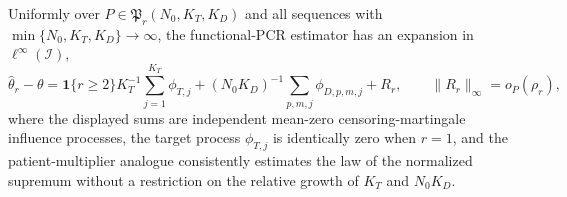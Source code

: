 Uniformly over \(P\in\mathfrak P_r(N_0,K_T,K_D)\) and all sequences with \(\min\{N_0,K_T,K_D\}\to\infty\), the functional-PCR estimator has an expansion in \(\ell^\infty(\mathcal I)\), \[\widehat\theta_r-\theta=\mathbf 1\{r\ge2\}K_T^{-1}\sum_{j=1}^{K_T}\phi_{T,j}+(N_0K_D)^{-1}\sum_{p,m,j}\phi_{D,p,m,j}+R_r,\qquad \|R_r\|_\infty=o_P(\rho_r),\] where the displayed sums are independent mean-zero censoring-martingale influence processes, the target process \(\phi_{T,j}\) is identically zero when \(r=1\), and the patient-multiplier analogue consistently estimates the law of the normalized supremum without a restriction on the relative growth of \(K_T\) and \(N_0K_D\).